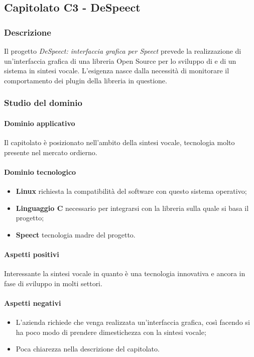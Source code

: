 	
	\subsection{Capitolato C3 - DeSpeect}
	\subsubsection{Descrizione}	
		Il progetto \emph{DeSpeect: interfaccia grafica per Speect} prevede la realizzazione di un'interfaccia grafica di una libreria Open Source per lo sviluppo di  e  di un sistema in sintesi vocale.
		L'esigenza nasce dalla necessità di monitorare il comportamento dei plugin della libreria in questione.
	\subsubsection{Studio del dominio}
	
	\paragraph{Dominio applicativo} \Spazio
     Il capitolato è posizionato nell'ambito della sintesi vocale, tecnologia molto presente nel mercato ordierno. 
	\paragraph{Dominio tecnologico}
	\begin{itemize}
		\item \textbf{Linux} richiesta la compatibilità del software con questo sistema operativo;
		\item  \textbf{Linguaggio C} necessario per integrarsi con la libreria sulla quale si basa il progetto;
		\item  \textbf{Speect} tecnologia madre del progetto.
	\end{itemize}
	\paragraph{Aspetti positivi} \Spazio
	Interessante la sintesi vocale in quanto è una tecnologia innovativa e ancora in fase di sviluppo in molti settori.
	\paragraph{Aspetti negativi} \Spazio 
	\begin{itemize}
		\item L'azienda richiede che venga realizzata un'interfaccia grafica, così facendo si ha poco modo di prendere dimestichezza con la sintesi vocale;
		\item Poca chiarezza nella descrizione del capitolato.
	\end{itemize}
